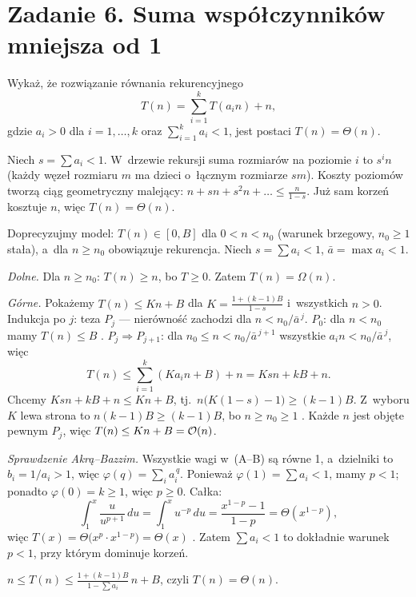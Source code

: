 \documentclass[11pt]{article}
\begin{document}
\section{Zadanie 6. Suma współczynników mniejsza od 1}
\begin{tresc}
Wykaż, że rozwiązanie równania rekurencyjnego
\[
T(n)=\sum_{i=1}^kT(a_in)+n,
\]
gdzie $a_i>0$ dla $i=1,\dots,k$ oraz $\sum_{i=1}^ka_i<1$,
jest postaci $T(n)=\Theta(n)$.
\end{tresc}

\begin{intuicja}
Niech $s=\sum a_i<1$. W~drzewie rekursji suma rozmiarów na poziomie $i$ to
$s^in$ (każdy węzeł rozmiaru $m$ ma dzieci o~łącznym rozmiarze $sm$). Koszty
poziomów tworzą ciąg geometryczny malejący: $n+sn+s^2n+\dots\le\frac{n}{1-s}$.
Już sam korzeń kosztuje $n$, więc $T(n)=\Theta(n)$.
\end{intuicja}
\formalnie
Doprecyzujmy model: $T(n)\in[0,B]$ dla $0<n<n_0$ (warunek brzegowy, $n_0\ge1$
stała), a~dla $n\ge n_0$ obowiązuje rekurencja. Niech $s=\sum a_i<1$,
$\bar a=\max a_i<1$.

\emph{Dolne.} Dla $n\ge n_0$: $T(n)\ge n$, bo $T\ge0$. Zatem $T(n)=\Omega(n)$.

\emph{Górne.} Pokażemy $T(n)\le Kn+B$ dla
$K=\frac{1+(k-1)B}{1-s}$ i~wszystkich $n>0$. Indukcja po $j$: teza $P_j$ ---
nierówność zachodzi dla $n<n_0/\bar a^{\,j}$.
$P_0$: dla $n<n_0$ mamy $T(n)\le B$ \checkmark. $P_j\Rightarrow P_{j+1}$: dla
$n_0\le n<n_0/\bar a^{\,j+1}$ wszystkie $a_in<n_0/\bar a^{\,j}$, więc
\[
T(n)\le\sum_{i=1}^k(Ka_in+B)+n = Ksn+kB+n.
\]
Chcemy $Ksn+kB+n\le Kn+B$, tj.\ $n\bigl(K(1-s)-1\bigr)\ge(k-1)B$. Z~wyboru $K$
lewa strona to $n(k-1)B\ge(k-1)B$, bo $n\ge n_0\ge1$ \checkmark.
Każde $n$ jest objęte pewnym $P_j$, więc $T(n)\le Kn+B=\mathcal{O}(n)$.

\emph{Sprawdzenie Akrą--Bazzim.} Wszystkie wagi w~(A--B) są równe 1,
a~dzielniki to $b_i=1/a_i>1$, więc $\varphi(q)=\sum_ia_i^{\,q}$.
Ponieważ $\varphi(1)=\sum a_i<1$, mamy $p<1$; ponadto $\varphi(0)=k\ge1$,
więc $p\ge0$. Całka:
\[
\int_1^x\frac{u}{u^{p+1}}\,du=\int_1^xu^{-p}\,du=\frac{x^{1-p}-1}{1-p}=\Theta(x^{1-p}),
\]
więc $T(x)=\Theta\bigl(x^p\cdot x^{1-p}\bigr)=\Theta(x)$ \checkmark. Zatem
$\sum a_i<1$ to dokładnie warunek $p<1$, przy którym dominuje korzeń.
\begin{odpowiedz}$n\le T(n)\le\frac{1+(k-1)B}{1-\sum a_i}\,n+B$, czyli $T(n)=\Theta(n)$.\end{odpowiedz}
\end{document}
